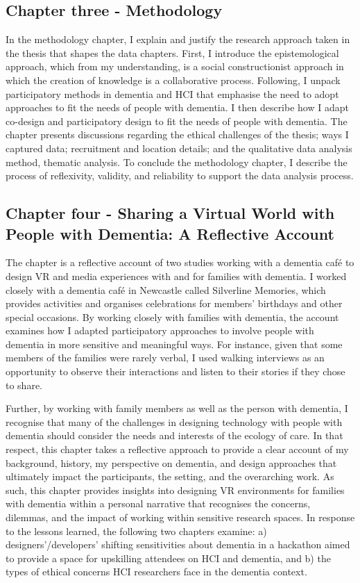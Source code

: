 \subsection{Chapter three - Methodology}
\label{Intro:ChapterThree}
In the methodology chapter, I explain and justify the research approach taken in the thesis that shapes the data chapters. First, I introduce the epistemological approach, which from my understanding, is a social constructionist approach in which the creation of knowledge is a collaborative process. Following, I unpack participatory methods in dementia and HCI that emphasise the need to adopt approaches to fit the needs of people with dementia. I then describe how I adapt co-design and participatory design to fit the needs of people with dementia. The chapter presents discussions regarding the ethical challenges of the thesis; ways I captured data; recruitment and location details; and the qualitative data analysis method, thematic analysis. To conclude the methodology chapter, I describe the process of reflexivity, validity, and reliability to support the data analysis process. 

\subsection{Chapter four - Sharing a Virtual World with People with Dementia: A Reflective Account}
\label{Intro:ChapterFour}
The chapter is a reflective account of two studies working with a dementia café to design VR and media experiences with and for families with dementia. I worked closely with a dementia café in Newcastle called Silverline Memories, which provides activities and organises celebrations for members’ birthdays and other special occasions. By working closely with families with dementia, the account examines how I adapted participatory approaches to involve people with dementia in more sensitive and meaningful ways. For instance, given that some members of the families were rarely verbal, I used walking interviews as an opportunity to observe their interactions and listen to their stories if they chose to share. 

Further, by working with family members as well as the person with dementia, I recognise that many of the challenges in designing technology with people with dementia should consider the needs and interests of the ecology of care. In that respect, this chapter takes a reflective approach to provide a clear account of my background, history, my perspective on dementia, and design approaches that ultimately impact the participants, the setting, and the overarching work. As such, this chapter provides insights into designing VR environments for families with dementia within a personal narrative that recognises the concerns, dilemmas, and the impact of working within sensitive research spaces. In response to the lessons learned, the following two chapters examine: a) designers'/developers' shifting sensitivities about dementia in a hackathon aimed to provide a space for upskilling attendees on HCI and dementia, and b) the types of ethical concerns HCI researchers face in the dementia context. 


